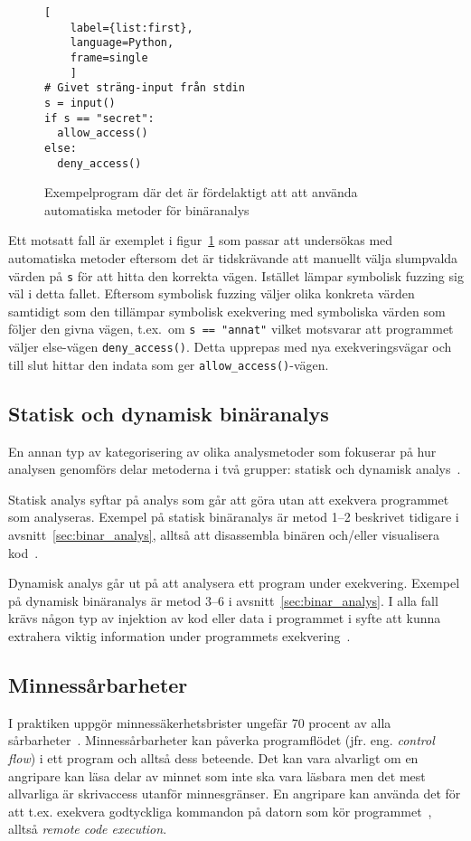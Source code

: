 \begin{figure}
    \begin{lstlisting}[
    label={list:first},
    language=Python,
    frame=single
    ]
# Givet sträng-input från stdin
s = input()
if s == "secret":
  allow_access()
else:
  deny_access()
\end{lstlisting}
    \caption{Exempelprogram där det är fördelaktigt att att använda automatiska metoder för binäranalys}
    \label{fig:automatic_method_example}
\end{figure}

Ett motsatt fall är exemplet i figur~\ref{fig:automatic_method_example} som passar
att undersökas med automatiska metoder eftersom det är tidskrävande
att manuellt välja slumpvalda värden på \texttt{s} för att hitta den korrekta
vägen. Istället lämpar symbolisk fuzzing sig väl i detta fallet. Eftersom
symbolisk fuzzing väljer olika konkreta värden samtidigt som den tillämpar
symbolisk exekvering med symboliska värden som följer den givna vägen, t.ex.\
om \lstinline{s == "annat"} vilket motsvarar att programmet väljer else-vägen
\lstinline{deny_access()}. Detta upprepas med nya exekveringsvägar och till slut
hittar den indata som ger \lstinline{allow_access()}-vägen.


\subsection{Statisk och dynamisk binäranalys}
En annan typ av kategorisering av olika analysmetoder som fokuserar på hur
analysen genomförs delar metoderna i två grupper: statisk och dynamisk
analys~\cite{dynamic_bin_analysis}.

Statisk analys syftar på analys som går att göra utan att exekvera programmet
som analyseras. Exempel på statisk binäranalys är metod 1--2 beskrivet tidigare
i avsnitt~\ref{sec:binar_analys}, alltså att disassembla binären och/eller
visualisera kod~\cite{dynamic_bin_analysis}.

Dynamisk analys går ut på att analysera ett program under
exekvering. Exempel på dynamisk binäranalys är metod 3--6 i
avsnitt~\ref{sec:binar_analys}. I alla fall krävs någon typ av injektion av kod
eller data i programmet i syfte att kunna extrahera viktig information under
programmets exekvering~\cite{dynamic_bin_analysis}.


\subsection{Minnessårbarheter}
I praktiken uppgör minnessäkerhetsbrister ungefär 70 procent av alla
sårbarheter~\cite{miller19}. Minnessårbarheter kan påverka programflödet (jfr.
eng. \emph{control flow}) i ett program och alltså dess beteende. Det kan
vara alvarligt om en angripare kan läsa delar av minnet som inte ska vara
läsbara men det mest allvarliga är skrivaccess utanför minnesgränser. En
angripare kan använda det för att t.ex. exekvera godtyckliga kommandon på
datorn som kör programmet~\cite{computer_security_cs161}, alltså \emph{remote
    code execution}.

